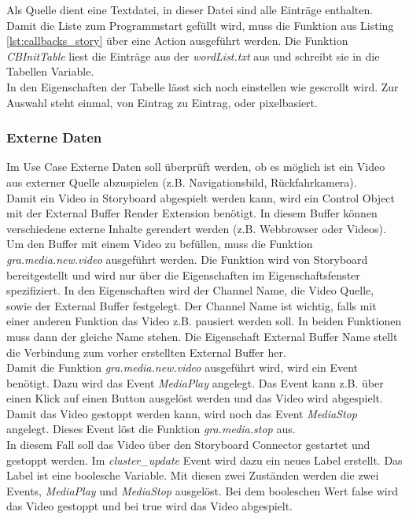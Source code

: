 Als Quelle dient eine Textdatei, in dieser Datei sind alle Einträge enthalten. Damit die Liste zum Programmstart gefüllt wird, muss die Funktion aus Listing \ref{lst:callbacks_story} über eine Action ausgeführt werden. Die Funktion \textit{CBInitTable} liest die Einträge aus der \textit{wordList.txt} aus und schreibt sie in die Tabellen Variable.\\

In den Eigenschaften der Tabelle lässt sich noch einstellen wie gescrollt wird. Zur Auswahl steht einmal, von Eintrag zu Eintrag, oder pixelbasiert.\\

\subsubsection{Externe Daten}
Im Use Case Externe Daten soll überprüft werden, ob es möglich ist ein Video aus externer Quelle abzuspielen (z.B. Navigationsbild, Rückfahrkamera). \\

Damit ein Video in Storyboard abgespielt werden kann, wird ein Control Object mit der External Buffer Render Extension benötigt. In diesem Buffer können verschiedene externe Inhalte gerendert werden (z.B. Webbrowser oder Videos).\\

Um den Buffer mit einem Video zu befüllen, muss die Funktion \textit{gra.media.new.video} ausgeführt werden. Die Funktion wird von Storyboard bereitgestellt und wird nur über die Eigenschaften im Eigenschaftsfenster spezifiziert. In den Eigenschaften wird der Channel Name, die Video Quelle, sowie der External Buffer festgelegt. Der Channel Name ist wichtig, falls mit einer anderen Funktion das Video z.B. pausiert werden soll. In beiden Funktionen muss dann der gleiche Name stehen. Die Eigenschaft External Buffer Name stellt die Verbindung zum vorher erstellten External Buffer her.\\

Damit die Funktion \textit{gra.media.new.video} ausgeführt wird, wird ein Event benötigt. Dazu wird das Event \textit{MediaPlay} angelegt. Das Event kann z.B. über einen Klick auf einen Button ausgelöst werden und das Video wird abgespielt. Damit das Video gestoppt werden kann, wird noch das Event \textit{MediaStop} angelegt. Dieses Event löst die Funktion \textit{gra.media.stop} aus.\\

In diesem Fall soll das Video über den Storyboard Connector gestartet und gestoppt werden. Im \textit{cluster\_update} Event wird dazu ein neues Label erstellt. Das Label ist eine boolesche Variable. Mit diesen zwei Zuständen werden die zwei Events, \textit{MediaPlay} und \textit{MediaStop} ausgelöst. Bei dem booleschen Wert false wird das Video gestoppt und bei true wird das Video abgespielt.\\

